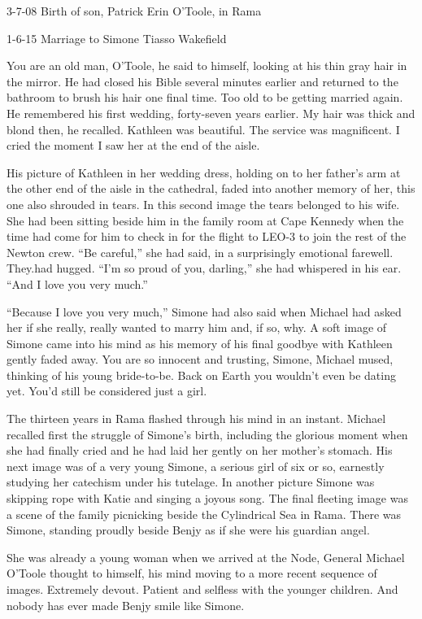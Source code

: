 \documentclass[]{article}
\begin{document}
{3-7-08 Birth of son, Patrick Erin O’Toole, in Rama

1-6-15 Marriage to Simone Tiasso Wakefield

You are an old man, O’Toole, he said to himself, looking at his thin gray hair in the mirror.  He had closed his Bible several minutes earlier and returned to the bathroom to brush his hair one final time.  Too old to be getting married again.  He remembered his first wedding, forty-seven years earlier.  My hair was thick and blond then, he recalled.  Kathleen was beautiful.  The service was magnificent.  I cried the moment I saw her at the end of the aisle.

His picture of Kathleen in her wedding dress, holding on to her father’s arm at the other end of the aisle in the cathedral, faded into another memory of her, this one also shrouded in tears.  In this second image the tears belonged to his wife.  She had been sitting beside him in the family room at Cape Kennedy when the time had come for him to check in for the flight to LEO-3 to join the rest of the Newton crew.  “Be careful,” she had said, in a surprisingly emotional farewell.  They.had hugged.  “I’m so proud of you, darling,” she had whispered in his ear.  “And I love you very much.”

“Because I love you very much,” Simone had also said when Michael had asked her if she really, really wanted to marry him and, if so, why.  A soft image of Simone came into his mind as his memory of his final goodbye with Kathleen gently faded away.  You are so innocent and trusting, Simone, Michael mused, thinking of his young bride-to-be.  Back on Earth you wouldn’t even be dating yet.  You’d still be considered just a girl.

The thirteen years in Rama flashed through his mind in an instant.  Michael recalled first the struggle of Simone’s birth, including the glorious moment when she had finally cried and he had laid her gently on her mother’s stomach.  His next image was of a very young Simone, a serious girl of six or so, earnestly studying her catechism under his tutelage.  In another picture Simone was skipping rope with Katie and singing a joyous song.  The final fleeting image was a scene of the family picnicking beside the Cylindrical Sea in Rama.  There was Simone, standing proudly beside Benjy as if she were his guardian angel.

She was already a young woman when we arrived at the Node, General Michael O’Toole thought to himself, his mind moving to a more recent sequence of images.  Extremely devout.  Patient and selfless with the younger children.  And nobody has ever made Benjy smile like Simone.

}
\end{document}

